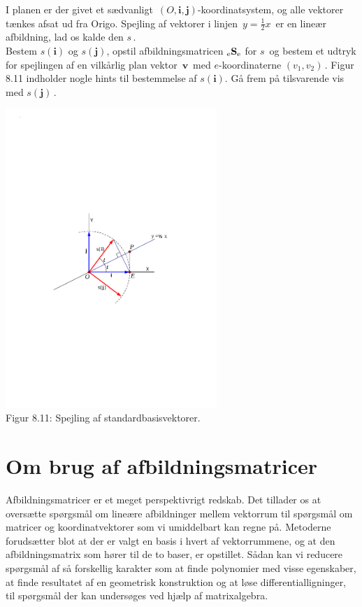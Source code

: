 \begin{exercise}\label{tn8.spejlingsopg2}
I planen er der givet et sædvanligt $\,(O,\mathbf i,\mathbf j)$-koordinatsystem, og alle vektorer tænkes afsat ud fra Origo. Spejling af vektorer i linjen $\,y=\frac 12 x\,$ er en lineær afbildning, lad os kalde den $s\,$.\\

Bestem $s(\mathbf i)$ og $s(\mathbf j)$, opstil afbildningsmatricen ${_\mathrm{e}\mathbf{S}_\mathrm{e}}$ for $s\,$ og bestem et udtryk for spejlingen af en vilkårlig plan vektor $\,\mathbf v\,$ med $e$-koordinaterne $(v_1,v_2)\,$. Figur 8.11 indholder nogle hints til bestemmelse af $s(\mathbf i)$. Gå frem på tilsvarende vis med $s(\mathbf j)\,$.

\begin{center}
		\includegraphics[trim=2cm 9cm 2cm
 12cm,width=0.60\textwidth,clip]{spejling2.pdf}
  \\Figur 8.11: Spejling af standardbasisvektorer.
\end{center}
\end{exercise}

\section{Om brug af afbildningsmatricer}\label{tn8.secBrugAfbildnM}

Afbildningsmatricer er et meget perspektivrigt redskab. Det tillader os at oversætte spørgsmål om lineære afbildninger mellem vektorrum til spørgsmål om matricer og koordinatvektorer som vi umiddelbart kan regne på. Metoderne forudsætter blot at der er valgt en basis i hvert af vektorrummene, og at den afbildningsmatrix som hører til de to baser, er opstillet. Sådan kan vi reducere spørgsmål af så forskellig karakter som at finde polynomier med visse egenskaber, at finde resultatet af en geometrisk konstruktion og at løse differentialligninger, til spørgsmål der kan undersøges ved hjælp af matrixalgebra.\bs

